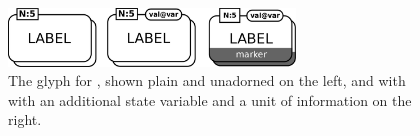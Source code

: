 \begin{figure}[H]
  \centering
  \includegraphics[width = 3.0in]{images/macromolMultimer}
  \caption{The \PD glyph for , shown plain and
    unadorned on the left, and with with an additional state variable and a
    unit of information on the right.}
  \label{fig:macromolMultimer}
\end{figure}




